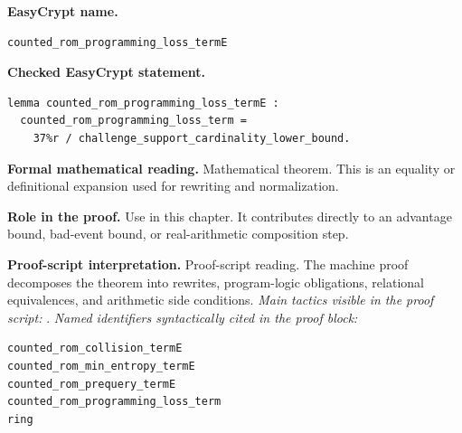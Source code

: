 \begin{formaltheorem}
\noindent\textbf{EasyCrypt name.}
\begin{lstlisting}[language=EasyCrypt,basicstyle=\ttfamily\scriptsize]
counted_rom_programming_loss_termE
\end{lstlisting}
\noindent\textbf{Checked EasyCrypt statement.}
\begin{lstlisting}[language=EasyCrypt,basicstyle=\ttfamily\scriptsize]
lemma counted_rom_programming_loss_termE :
  counted_rom_programming_loss_term =
    37%r / challenge_support_cardinality_lower_bound.
\end{lstlisting}
\noindent\textbf{Formal mathematical reading.}
Mathematical theorem. This is an equality or definitional expansion used for rewriting and normalization.

\noindent\textbf{Role in the proof.}
Use in this chapter. It contributes directly to an advantage bound, bad-event bound, or real-arithmetic composition step.

\noindent\textbf{Proof-script interpretation.}
Proof-script reading. The machine proof decomposes the theorem into rewrites, program-logic obligations, relational equivalences, and arithmetic side conditions.
\emph{Main tactics visible in the proof script:} .
\emph{Named identifiers syntactically cited in the proof block:}
\begin{lstlisting}[language=EasyCrypt,basicstyle=\ttfamily\scriptsize]
counted_rom_collision_termE
counted_rom_min_entropy_termE
counted_rom_prequery_termE
counted_rom_programming_loss_term
ring
\end{lstlisting}

\end{formaltheorem}

